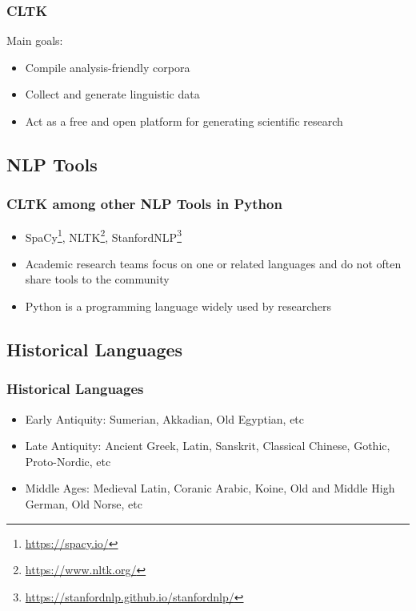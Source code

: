 \documentclass{beamer}
\begin{document}
\begin{frame}
\frametitle{CLTK}
Main goals:
\begin{itemize}
\item Compile analysis-friendly corpora
\item Collect and generate linguistic data
\item Act as a free and open platform for generating scientific research
\end{itemize}
    
\end{frame}

\subsection{NLP Tools}
\begin{frame}
\frametitle{CLTK among other NLP Tools in Python}
\begin{itemize}
    
    \item SpaCy\footnote{\href{https://spacy.io/}{https://spacy.io/}}, NLTK\footnote{\href{https://www.nltk.org/}{https://www.nltk.org/}}, StanfordNLP\footnote{\href{https://stanfordnlp.github.io/stanfordnlp/}{https://stanfordnlp.github.io/stanfordnlp/}}
    \item Academic research teams focus on one or related languages and do not often share tools to the community  
    \item Python is a programming language widely used by researchers
\end{itemize}
\end{frame}


\subsection{Historical Languages}

\begin{frame}
\frametitle{Historical Languages}
\begin{itemize}
    \item Early Antiquity: Sumerian, Akkadian, Old Egyptian, etc
    \item Late Antiquity: Ancient Greek, Latin, Sanskrit, Classical Chinese, Gothic, Proto-Nordic, etc
    \item Middle Ages: Medieval Latin, Coranic Arabic, Koine, Old and Middle High German, Old Norse, etc
\end{itemize}
\end{frame}
\end{document}
